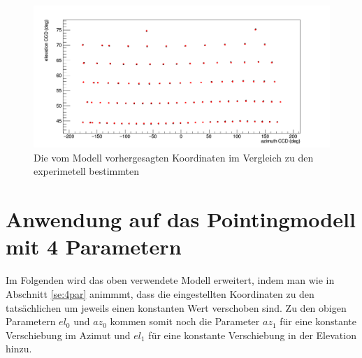 \begin{figure}[htbp]
\centering
\includegraphics[width=\textwidth]{../341/D2Ccomp2.png}
\caption{Die vom Modell vorhergesagten Koordinaten im Vergleich zu den experimetell bestimmten}
\label{img:D2Ccomp2}
\end{figure}

\section{Anwendung auf das Pointingmodell mit 4 Parametern}
Im Folgenden wird das oben verwendete Modell erweitert, indem man wie in Abschnitt \ref{se:4par} animmmt, dass die eingestellten Koordinaten zu den tatsächlichen um jeweils einen konstanten Wert verschoben sind. Zu den obigen Parametern $el_0$ und $az_0$ kommen somit noch die Parameter $az_1$ für eine konstante Verschiebung im Azimut und $el_1$ für eine konstante Verschiebung in der Elevation hinzu.
